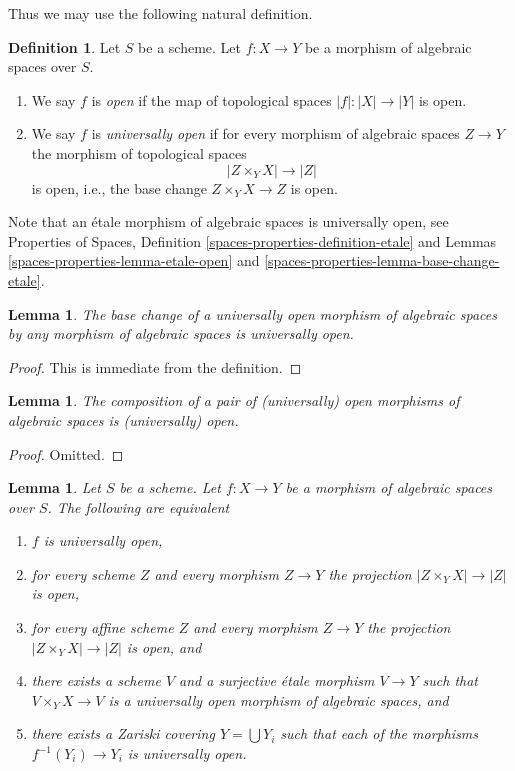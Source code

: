 \documentclass{stacks-project}
\theoremstyle{plain}
\newtheorem{lemma}[subsection]{Lemma}
\theoremstyle{definition}
\newtheorem{definition}[subsection]{Definition}
\theoremstyle{remark}
\numberwithin{equation}{subsection}
\begin{document}
\noindent
Thus we may use the following natural definition.

\begin{definition}
\label{definition-open}
Let $S$ be a scheme. Let $f : X \to Y$ be a morphism of algebraic spaces
over $S$.
\begin{enumerate}
\item We say $f$ is {\it open} if the map of topological spaces
$|f| : |X| \to |Y|$ is open.
\item We say $f$ is {\it universally open} if for every morphism
of algebraic spaces $Z \to Y$ the morphism of topological spaces
$$
|Z \times_Y X| \to |Z|
$$
is open, i.e., the base change $Z \times_Y X \to Z$ is open.
\end{enumerate}
\end{definition}

\noindent
Note that an \'etale morphism of algebraic spaces is universally open,
see
Properties of Spaces, Definition \ref{spaces-properties-definition-etale} and
Lemmas \ref{spaces-properties-lemma-etale-open} and
\ref{spaces-properties-lemma-base-change-etale}.

\begin{lemma}
\label{lemma-base-change-universally-open}
The base change of a universally open morphism of algebraic spaces
by any morphism of algebraic spaces is universally open.
\end{lemma}

\begin{proof}
This is immediate from the definition.
\end{proof}

\begin{lemma}
\label{lemma-composition-open}
The composition of a pair of (universally) open morphisms of algebraic spaces
is (universally) open.
\end{lemma}

\begin{proof}
Omitted.
\end{proof}

\begin{lemma}
\label{lemma-universally-open-local}
Let $S$ be a scheme. Let $f : X \to Y$ be a morphism of algebraic spaces
over $S$. The following are equivalent
\begin{enumerate}
\item $f$ is universally open,
\item for every scheme $Z$ and every morphism $Z \to Y$
the projection $|Z \times_Y X| \to |Z|$ is open,
\item for every affine scheme $Z$ and every morphism $Z \to Y$
the projection $|Z \times_Y X| \to |Z|$ is open, and
\item there exists a scheme $V$ and a surjective \'etale morphism
$V \to Y$ such that $V \times_Y X \to V$ is a universally open morphism
of algebraic spaces, and
\item there exists a Zariski covering $Y = \bigcup Y_i$ such that
each of the morphisms $f^{-1}(Y_i) \to Y_i$ is universally open.
\end{enumerate}
\end{lemma}
\end{document}
